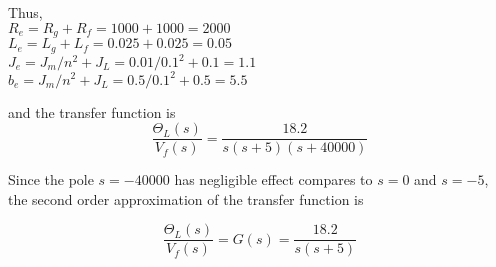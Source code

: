 Thus,\\
$ R_e = R_g + R_f = 1000 + 1000 = 2000 $\\
$ L_e = L_g + L_f = 0.025 + 0.025 = 0.05 $\\
$ J_e = J_m/n^2 + J_L = 0.01/0.1^2 + 0.1 = 1.1 $\\
$ b_e = J_m/n^2 + J_L = 0.5/0.1^2 + 0.5 = 5.5 $

and the transfer function is
\begin{equation}\label{e10}
	\dfrac{\Theta_L(s)}{V_f(s)} = \dfrac{18.2}{s\left(s+5\right)\left(s + 40000\right)}
\end{equation}

Since the pole $ s = -40000 $ has negligible effect compares to $ s=0 $ and $ s=-5 $, the second order approximation of the transfer function is

\begin{equation}\label{e11}
		\dfrac{\Theta_L(s)}{V_f(s)} = G(s) = \dfrac{18.2}{s\left(s+5\right)}
\end{equation}